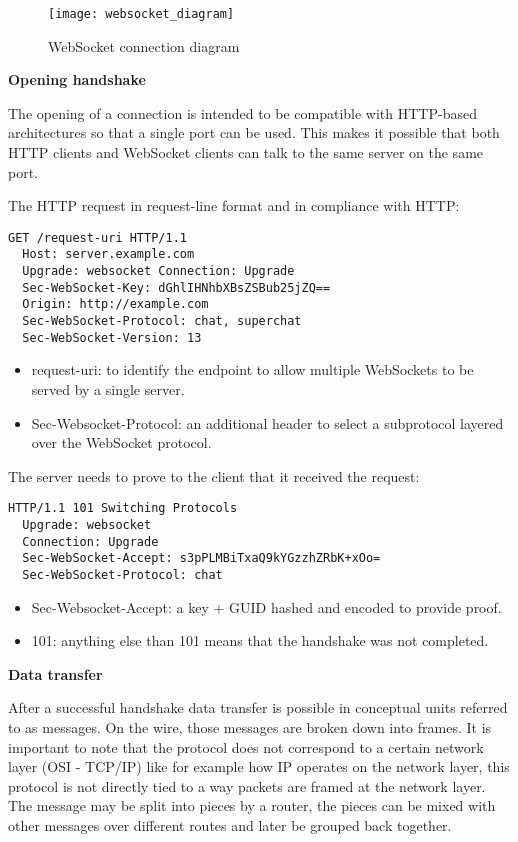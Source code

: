 \begin{figure}[h]
  \caption{WebSocket connection diagram}
  \texttt{[image: websocket\_diagram]}
  \centering
\end{figure}

\textbf{Opening handshake}

The opening of a connection is intended to be compatible with HTTP-based architectures so that a single port can be used. This makes it possible that both HTTP clients and WebSocket clients can talk to the same server on the same port. \cite{ws-rfc}

The HTTP request in request-line format and in compliance with HTTP:
\begin{lstlisting}[caption=WebSocket opening handshake HTTP GET Upgrade request, style=nohighlight]
  GET /request-uri HTTP/1.1 
  Host: server.example.com 
  Upgrade: websocket Connection: Upgrade 
  Sec-WebSocket-Key: dGhlIHNhbXBsZSBub25jZQ== 
  Origin: http://example.com 
  Sec-WebSocket-Protocol: chat, superchat 
  Sec-WebSocket-Version: 13  
\end{lstlisting}

\begin{itemize}
  \item request-uri:  to identify the endpoint to allow multiple WebSockets to be served by a single server.
  \item Sec-Websocket-Protocol: an additional header to select a subprotocol layered over the WebSocket protocol.
\end{itemize}

The server needs to prove to the client that it received the request:
\begin{lstlisting}[caption=WebSocket opening handshake server response, style=nohighlight]
  HTTP/1.1 101 Switching Protocols
  Upgrade: websocket
  Connection: Upgrade
  Sec-WebSocket-Accept: s3pPLMBiTxaQ9kYGzzhZRbK+xOo=
  Sec-WebSocket-Protocol: chat
\end{lstlisting}

\begin{itemize}
  \item Sec-Websocket-Accept: a key + GUID hashed and encoded to provide proof.
  \item 101: anything else than 101 means that the handshake was not completed.
\end{itemize}

\textbf{Data transfer}

After a successful handshake data transfer is possible in conceptual units referred to as messages. On the wire, those messages are broken down into frames. It is important to note that the protocol does not correspond to a certain network layer (OSI - TCP/IP) like for example how IP operates on the network layer, this protocol is not directly tied to a way packets are framed at the network layer. The message may be split into pieces by a router, the pieces can be mixed with other messages over different routes and later be grouped back together. \cite{ws-rfc}

